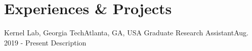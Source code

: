 \section{Experiences \& Projects}
  \resumeSubHeadingListStart
    \resumeSubheading
      {Kernel Lab, Georgia Tech}{Atlanta, GA, USA}
      {Graduate Research Assistant}{Aug. 2019 - Present}
      \resumeItemListStart
          {Description}
      \resumeItemListEnd
  \resumeSubHeadingListEnd

